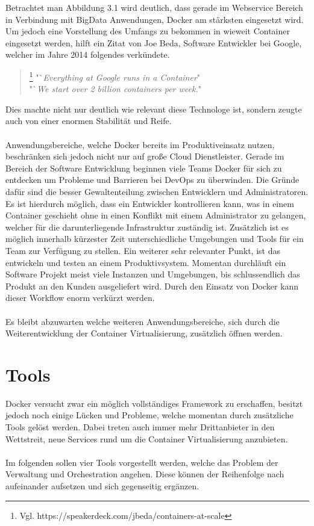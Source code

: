\documentclass[12pt,toc=bib,toc=listof]{scrreprt}
\begin{document}
Betrachtet man Abbildung 3.1 wird deutlich, dass gerade im Webservice Bereich in Verbindung mit BigData Anwendungen, Docker am stärksten eingesetzt wird.
Um jedoch eine Vorstellung des Umfangs zu bekommen in wieweit Container eingesetzt werden, hilft ein Zitat von Joe Beda, Software Entwickler bei Google, welcher im Jahre 2014 folgendes verkündete.
\begin{quote}
	\footnote[2]{Vgl. https://speakerdeck.com/jbeda/containers-at-scale}
	"`\textit{Everything at Google runs in a Container}"\\
	"`\textit{We start over 2 billion containers per week.}"
\end{quote}
Dies machte nicht nur deutlich wie relevant diese Technologe ist, sondern zeugte auch von einer enormen Stabilität und Reife.\\
\\
Anwendungsbereiche, welche Docker bereits im Produktiveinsatz nutzen, beschränken sich jedoch nicht nur auf große Cloud Dienstleister.
Gerade im Bereich der Software Entwicklung beginnen viele Teams Docker für sich zu entdecken um Probleme und Barrieren bei DevOps zu überwinden.
Die Gründe dafür sind die besser Gewaltenteilung zwischen Entwicklern und Administratoren.
Es ist hierdurch möglich, dass ein Entwickler kontrollieren kann, was in einem Container geschieht ohne in einen Konflikt mit einem Administrator zu gelangen, welcher für die darunterliegende Infrastruktur zuständig ist. 
Zusätzlich ist es möglich innerhalb kürzester Zeit unterschiedliche Umgebungen und Tools für ein Team zur Verfügung zu stellen.
Ein weiterer sehr relevanter Punkt, ist das entwickeln und testen an einem Produktivsystem. Momentan durchläuft ein Software Projekt meist viele Instanzen und Umgebungen, bis schlussendlich das Produkt an den Kunden ausgeliefert wird. Durch den Einsatz von Docker kann dieser Workflow enorm verkürzt werden.\\
\\
Es bleibt abzuwarten welche weiteren Anwendungsbereiche, sich durch die Weiterentwicklung der Container Virtualisierung, zusätzlich öffnen werden.

\section{Tools}
Docker versucht zwar ein möglich vollständiges Framework zu erschaffen, besitzt jedoch noch einige Lücken und Probleme, welche momentan durch zusätzliche Tools gelöst werden.
Dabei treten auch immer mehr Drittanbieter in den Wettstreit, neue Services rund um die Container Virtualisierung anzubieten.\\
\\
Im folgenden sollen vier Tools vorgestellt werden, welche das Problem der Verwaltung und Orchestration angehen.
Diese können der Reihenfolge nach aufeinander aufsetzen und sich gegenseitig ergänzen.
\end{document}
